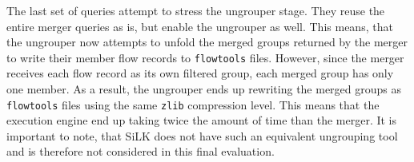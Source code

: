 The last set of queries attempt to stress the ungrouper stage. They reuse the
entire merger queries as is, but enable the ungrouper as well. This means,
that the ungrouper now attempts to unfold the merged groups returned by the
merger to write their member flow records to \texttt{flowtools} files.
However, since the merger receives each flow record as its own filtered group,
each merged group has only one member. As a result, the ungrouper ends up
rewriting the merged groups as \texttt{flowtools} files using the same
\texttt{zlib} compression level. This means that the execution engine end up
taking twice the amount of time than the merger. It is important to note, that
SiLK does not have such an equivalent ungrouping tool and is therefore not
considered in this final evaluation.
